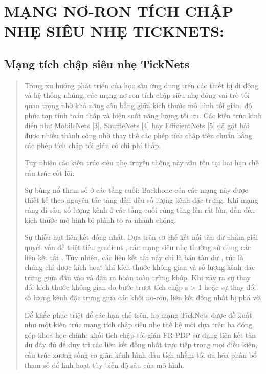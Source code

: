 \documentclass[
  12pt,
  a4paper,
]{report}
\begin{document}
\section{MẠNG NƠ-RON TÍCH CHẬP NHẸ SIÊU NHẸ
TICKNETS:}\label{mux1ea1ng-nux1a1-ron-tuxedch-chux1eadp-nhux1eb9-siuxeau-nhux1eb9-ticknets}

\subsection{Mạng tích chập siêu nhẹ
TickNets}\label{mux1ea1ng-tuxedch-chux1eadp-siuxeau-nhux1eb9-ticknets}

\begin{quote}
Trong xu hướng phát triển của học sâu ứng dụng trên các thiết bị di động
và hệ thống nhúng, các mạng nơ-ron tích chập siêu nhẹ đóng vai trò tối
quan trọng nhờ khả năng cân bằng giữa kích thước mô hình tối giản, độ
phức tạp tính toán thấp và hiệu suất năng lượng tối ưu. Các kiến trúc
kinh điển như MobileNets {[}3{]}, ShuffleNets {[}4{]} hay EfficientNets
{[}5{]} đã gặt hái được nhiều thành công nhờ thay thế các phép tích chập
tiêu chuẩn bằng các phép tích chập tối giản có chi phí thấp.

Tuy nhiên các kiến trúc siêu nhẹ truyền thống này vẫn tồn tại hai hạn
chế cấu trúc cốt lõi:

Sự bùng nổ tham số ở các tầng cuối: Backbone của các mạng này được thiết
kế theo nguyên tắc tăng dần đều số lượng kênh đặc trưng. Khi mạng càng
đi sâu, số lượng kênh ở các tầng cuối cùng tăng lên rất lớn, dẫn đến
kích thước mô hình bị phình to ra nhanh chóng.

Sự thiếu hụt liên kết đồng nhất. Dựa trên cơ chế kết nối tàn dư nhằm
giải quyết vấn đề triệt tiêu gradient , các mạng siêu nhẹ thường sử dụng
các liên kết tắt . Tuy nhiên, các liên kết tắt này chỉ là bán tàn dư ,
tức là chúng chỉ được kích hoạt khi kích thước không gian và số lượng
kênh đặc trưng giữa đầu vào và đầu ra hoàn toàn trùng khớp. Khi xảy ra
sự thay đổi kích thước không gian do bước trượt tích chập s
\textgreater{} 1 hoặc sự thay đổi số lượng kênh đặc trưng giữa các khối
nơ-ron, liên kết đồng nhất bị phá vỡ.

Để khắc phục triệt để các hạn chế trên, họ mạng TickNets được đề xuất
như một kiến trúc mạng tích chập siêu nhẹ thế hệ mới dựa trên ba đóng
góp khoa học chính: khối tích chập tối giản FR-PDP sử dụng liên kết tàn
dư đầy đủ để duy trì các liên kết đồng nhất trực tiếp trong mọi điều
kiện, cấu trúc xương sống co giãn kênh hình dấu tích nhằm tối ưu hóa
phân bổ tham số để linh hoạt tùy biến độ sâu của mô hình.
\end{quote}
\end{document}
